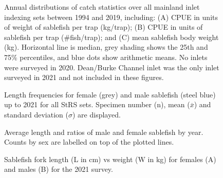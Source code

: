 \documentclass[12pt]{article}\usepackage[]{graphicx}\usepackage[]{color}
\begin{document}
\begin{figure}[htb]

{\centering {} 

}

\caption{Annual distributions of catch statistics over all mainland inlet indexing sets between 1994 and 2019, including: (A) CPUE in units of weight of sablefish per trap (kg/trap); (B) CPUE in units of sablefish per trap (\#fish/trap); and (C) mean sablefish body weight (kg). Horizontal line is median, grey shading shows the 25th and 75\% percentiles, and blue dots show arithmetic means. No inlets were surveyed in 2020. Dean/Burke Channel inlet was the only inlet surveyed in 2021 and not included in these figures.}\label{fig:figure11}
\end{figure}
\clearpage


\begin{figure}[htb]

{\centering {} 

}

\caption{Length frequencies for female (grey) and male sablefish (steel blue) up to 2021 for all StRS sets. Specimen number (n), mean (\(\overline{x}\)) and standard deviation (\(\sigma\)) are displayed.}\label{fig:figure12}
\end{figure}

\begin{figure}[htb]

{\centering {} 

}

\caption{Average length and ratios of male and female sablefish by year. Counts by sex are labelled on top of the plotted lines.}\label{fig:figure13}
\end{figure}
\clearpage


\begin{figure}[htb]

{\centering {} 

}

\caption{Sablefish fork length (L in cm) vs weight (W in kg) for females (A) and males (B) for the 2021 survey.}\label{fig:figure14}
\end{figure}
\end{document}
